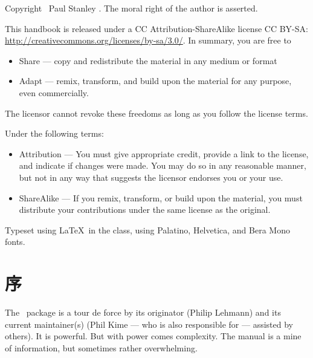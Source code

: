 \maketitle

\strut\vspace{10cm}

Copyright \textcopyright\ Paul Stanley \releasedate. The moral right of the author is asserted.

\vspace{2pc}

{\small This handbook is released under a CC Attribution-ShareAlike
  license CC BY-SA:
  \url{http://creativecommons.org/licenses/by-sa/3.0/}. In summary,
  you are free to
\begin{itemize}
\item Share --- copy and redistribute the material in any medium or
  format
\item Adapt --- remix, transform, and build upon the material for any
  purpose, even commercially.
\end{itemize}
The licensor cannot revoke these freedoms as long as you follow the
license terms.

Under the following terms:
\begin{itemize}
\item Attribution --- You must give appropriate credit, provide a link
  to the license, and indicate if changes were made. You may do so in
  any reasonable manner, but not in any way that suggests the licensor
  endorses you or your use.
\item ShareAlike --- If you remix, transform, or build upon the
  material, you must distribute your contributions under the same
  license as the original.
\end{itemize}
}

\vspace{2pc} Typeset using \LaTeX\ in the  class,
using Palatino, Helvetica, and Bera Mono fonts.  \cleardoublepage

\tableofcontents

\chapter{序}

The \biblatex\ package is a tour de force by its originator (Philip
Lehmann) and its current maintainer(s) (Phil Kime --- who is also
responsible for  --- assisted by others). It is
powerful. But with power comes complexity. The manual is a mine of
information, but sometimes rather overwhelming.

